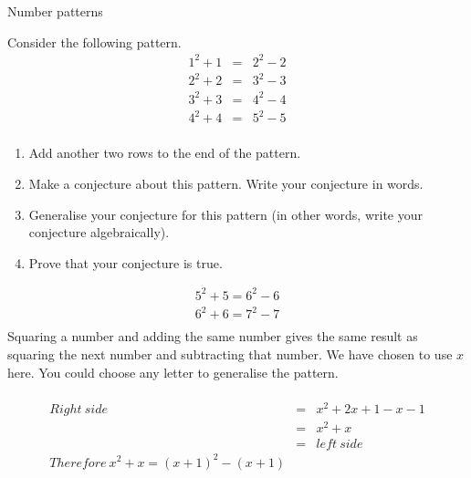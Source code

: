\documentclass[10pt,a4paper,titlepage,twoside,openright]{report}
\begin{document}
\begin{wex}{Number patterns}{Consider the following pattern.
\begin{eqnarray*}
	1^2 + 1 &=& 2^2 - 2\\
	2^2 + 2 &=& 3^2 - 3\\
	3^2 + 3 &=& 4^2 - 4\\
	4^2 + 4 &=& 5^2 - 5\\
\end{eqnarray*}
\begin{enumerate}
	\item{Add another two rows to the end of the pattern.}
	\item{Make a conjecture about this pattern. Write your conjecture in words.}
	\item{Generalise your conjecture for this pattern (in other words, write your conjecture algebraically).}
	\item{Prove that your conjecture is true.}
\end{enumerate}}{
\begin{eqnarray*}
5^2 + 5 = 6^2 - 6\\
6^2 + 6 = 7^2 - 7\\
\end{eqnarray*}
Squaring a number and adding the same number gives the same result as squaring the next number and subtracting that number.
We have chosen to use $x$ here. You could choose any letter to generalise the pattern.
\\
\\
\begin{eqnarray*}
Right~side	&=& x^2 + 2x + 1 - x - 1\\
		&=& x^2 + x\\
		&=& left~ side\\
Therefore~		 x^2 + x = (x + 1)^2 - (x + 1)
\end{eqnarray*}
}
\end{wex}
\end{document}

